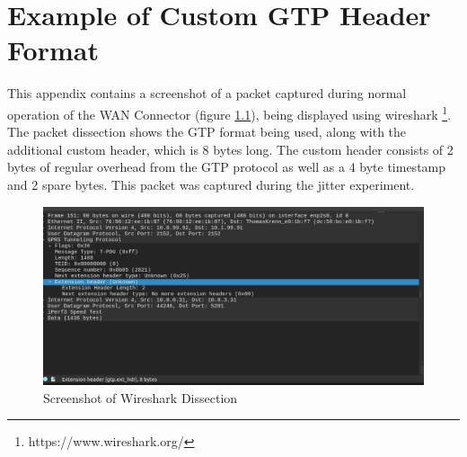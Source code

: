 
\cleardoublepage
\chapter{Example of Custom GTP Header Format}
\label{appendix:gtp}

This appendix contains a screenshot of a packet captured during normal operation of the WAN Connector (figure \ref{fig:wshark}), being displayed using wireshark \footnote{https://www.wireshark.org/}. The packet dissection shows the GTP format being used, along with the additional custom header, which is 8 bytes long. The custom header consists of 2 bytes of regular overhead from the GTP protocol as well as a 4 byte timestamp and 2 spare bytes. This packet was captured during the jitter experiment.

\begin{figure}[ht]
    \centering
	\includegraphics[width=\linewidth]{fig/gtp_2.png}
	\caption{Screenshot of Wireshark Dissection}
	\label{fig:wshark}
\end{figure} 

